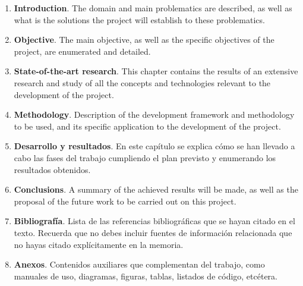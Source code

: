 \begin{enumerate}

\item \textbf{Introduction}. The domain and main problematics are described, as well as what is the solutions the project will establish to these problematics.

\item \textbf{Objective}. The main objective, as well as the specific objectives of the project, are enumerated and detailed.

\item \textbf{State-of-the-art research}. This chapter contains the results of an extensive research and study of all the concepts and technologies relevant to the development of the project.

\item \textbf{Methodology}. Description of the development framework and methodology to be used, and its specific application to the development of the project.

\item \textbf{Desarrollo y resultados}. En este capítulo se explica cómo se han llevado a cabo las fases del trabajo cumpliendo el plan previsto y enumerando los resultados obtenidos.

\item \textbf{Conclusions}. A summary of the achieved results will be made, as well as the proposal of the future work to be carried out on this project.

\item \textbf{Bibliografía}. Lista de las referencias bibliográficas que se hayan citado en el texto. Recuerda que no debes incluir fuentes de información relacionada que no hayas citado explícitamente en la memoria.

\item \textbf{Anexos}. Contenidos auxiliares que complementan del trabajo, como manuales de uso, diagramas, figuras, tablas, listados de código, etcétera.
\end{enumerate}









